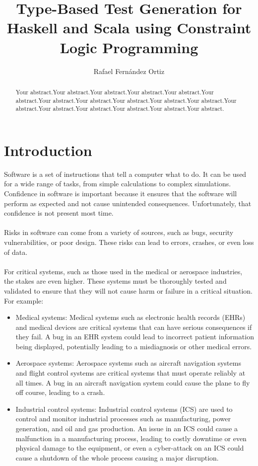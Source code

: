 \documentclass{report}
\title{Type-Based Test Generation for Haskell and Scala using Constraint Logic Programming}
\author{Rafael Fernández Ortiz}
\begin{document}
\maketitle
\begin{abstract}
Your abstract.Your abstract.Your abstract.Your abstract.Your abstract.Your abstract.Your abstract.Your abstract.Your abstract.Your abstract.Your abstract.Your abstract.Your abstract.Your abstract.Your abstract.Your abstract.Your abstract.
\end{abstract}
\tableofcontents

\chapter{Introduction}

Software is a set of instructions that tell a computer what to do. It can be used for a wide range of tasks, from simple calculations to complex simulations. Confidence in software is important because it ensures that the software will perform as expected and not cause unintended consequences. Unfortunately, that confidence is not present most time.\\\\
Risks in software can come from a variety of sources, such as bugs, security vulnerabilities, or poor design. These risks can lead to errors, crashes, or even loss of data.\\\\
For critical systems, such as those used in the medical or aerospace industries, the stakes are even higher. These systems must be thoroughly tested and validated to ensure that they will not cause harm or failure in a critical situation. For example:
\begin{itemize}
    \item Medical systems: Medical systems such as electronic health records (EHRs) and medical devices are critical systems that can have serious consequences if they fail. A bug in an EHR system could lead to incorrect patient information being displayed, potentially leading to a misdiagnosis or other medical errors.
    \item Aerospace systems: Aerospace systems such as aircraft navigation systems and flight control systems are critical systems that must operate reliably at all times. A bug in an aircraft navigation system could cause the plane to fly off course, leading to a crash.
    \item Industrial control systems: Industrial control systems (ICS) are used to control and monitor industrial processes such as manufacturing, power generation, and oil and gas production. An issue in an ICS could cause a malfunction in a manufacturing process, leading to costly downtime or even physical damage to the equipment, or even a cyber-attack on an ICS could cause a shutdown of the whole process causing a major disruption.
\end{itemize}
\end{document}
